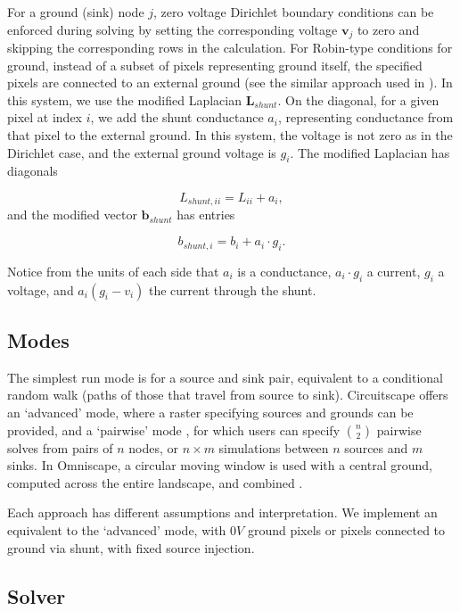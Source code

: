 \documentclass[11pt, a4paper]{article}
\begin{document}
For a ground (sink) node $j$, zero voltage Dirichlet boundary conditions can be enforced during solving by setting the corresponding voltage $\mathbf{v}_j$ to zero and skipping the corresponding rows in the calculation. For Robin-type conditions for ground, instead of a subset of pixels representing ground itself, the specified pixels are connected to an external ground (see the similar approach used in \cite{vasilyeva2026multiscale}). In this system, we use the modified Laplacian $\mathbf{L}_{shunt}$. On the diagonal, for a given pixel at index $i$, we add the shunt conductance $a_i$, representing conductance from that pixel to the external ground. In this system, the voltage is not zero as in the Dirichlet case, and the external ground voltage is $g_i$. The modified Laplacian has diagonals

\begin{equation}
\label{eq:shunt}
L_{{shunt},ii} = L_{ii} + a_i,
\end{equation}
and the modified vector $\mathbf{b}_{shunt}$ has entries

\[
b_{{shunt},i} = b_i + a_i \cdot g_i.
\]

Notice from the units of each side that $a_i$ is a conductance, $a_i \cdot g_i$ a current, $g_i$ a voltage, and $a_i(g_i-v_i)$ the current through the shunt.

\subsection{Modes}

The simplest run mode is for a source and sink pair, equivalent to a conditional random walk (paths of those that travel from source to sink). Circuitscape offers an `advanced' mode, where a raster specifying sources and grounds can be provided, and a `pairwise' mode \cite{hall2021circuitscape}, for which users can specify $n \choose 2$ pairwise solves from pairs of $n$ nodes, or $n \times m$ simulations between $n$ sources and $m$ sinks. In Omniscape, a circular moving window is used with a central ground, computed across the entire landscape, and combined \cite{landau2021omniscape}.

Each approach has different assumptions and interpretation. We implement an equivalent to the `advanced' mode, with $0V$ ground pixels or pixels connected to ground via shunt, with fixed source injection.

\subsection{Solver}
\end{document}
